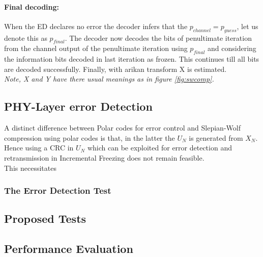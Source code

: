 \documentclass[
11pt, %
a4paper, %
oneside, %
headinclude,footinclude, %
BCOR5mm, %
]{scrartcl}
\begin{document}
\paragraph{Final decoding:}When the ED declares no error the decoder infers that the $p_{channel}=p_{guess}$, let us denote this as $p_{final}$. The decoder now  decodes the bits of penultimate iteration from the channel output of the penultimate iteration using $p_{final}$ and considering the information bits decoded in last iteration as frozen. This continues till all bits are decoded successfully. Finally, with arikan transform X is estimated.
\\\emph{Note, X and Y have there usual meanings as in figure \ref{fig:swcomp}.}  


\subsection{PHY-Layer error Detection} 

A distinct difference between Polar codes for error control and Slepian-Wolf compression using polar codes is that, in the latter the $U_N$ is generated from $X_N$. Hence using a CRC in $U_N$ which can be exploited for error detection and retransmission in Incremental Freezing does not remain feasible.\\This necessitates  

\subsubsection{The Error Detection Test }
\subsection{Proposed Tests}
\subsection{Performance Evaluation}

\newpage
\end{document}
